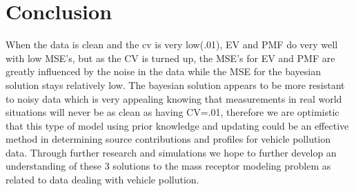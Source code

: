 \documentclass{report}
\begin{document}
\section*{Conclusion}
When the data is clean and the cv is very low(.01), EV and PMF do very well with low MSE's, but as the CV is turned up, the MSE's for EV and PMF are greatly influenced by the noise in the data while the MSE for the bayesian solution stays relatively low.  The bayesian solution appears to be more resistant to noisy data which is very appealing knowing that measurements in real world situations will never be as clean as having CV=.01, therefore we are optimistic that this type of model using prior knowledge and updating could be an effective method in determining source contributions and profiles for vehicle pollution data.  Through further research and simulations we hope to further develop an understanding of these 3 solutions to the mass receptor modeling problem as related to data dealing with vehicle pollution.
\end{document}
